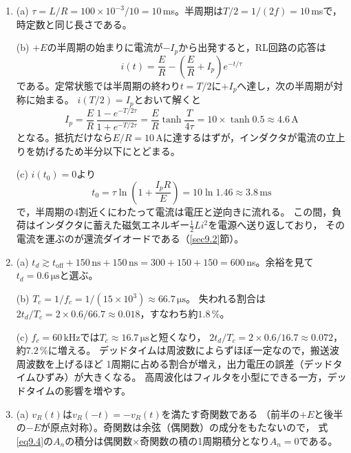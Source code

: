 \answer
\begin{enumerate}

\item[\ref{ex9.1}]
(a) $\tau = L/R = 100\times10^{-3}/10 = 10$\,ms。半周期は$T/2 = 1/(2f) = 10$\,msで，時定数と同じ長さである。

(b) $+E$の半周期の始まりに電流が$-I_p$から出発すると，RL回路の応答は
\begin{equation*}
i(t) = \frac{E}{R} - \left(\frac{E}{R} + I_p\right)e^{-t/\tau}
\end{equation*}
である。定常状態では半周期の終わり$t = T/2$に$+I_p$へ達し，次の半周期が対称に始まる。
$i(T/2) = I_p$とおいて解くと
\begin{equation*}
I_p = \frac{E}{R}\,\frac{1 - e^{-T/2\tau}}{1 + e^{-T/2\tau}} = \frac{E}{R}\tanh\frac{T}{4\tau}
= 10\times\tanh 0.5 \approx 4.6\,\mathrm{A}
\end{equation*}
となる。抵抗だけなら$E/R = 10$\,Aに達するはずが，インダクタが電流の立上りを妨げるため半分以下にとどまる。

(c) $i(t_0) = 0$より
\begin{equation*}
t_0 = \tau\ln\left(1 + \frac{I_pR}{E}\right) = 10\ln 1.46 \approx 3.8\,\mathrm{ms}
\end{equation*}
で，半周期の4割近くにわたって電流は電圧と逆向きに流れる。
この間，負荷はインダクタに蓄えた磁気エネルギー$\frac{1}{2}Li^2$を電源へ送り返しており，
その電流を運ぶのが還流ダイオードである（\ref{sec9.2}節）。

\item[\ref{ex9.2}]
(a) $t_d \gtrsim t_{\mathrm{off}} + 150\,\mathrm{ns} + 150\,\mathrm{ns}
= 300 + 150 + 150 = 600$\,ns。余裕を見て$t_d = 0.6\,\mathrm{\mu s}$と選ぶ。

(b) $T_c = 1/f_c = 1/(15\times10^3) \approx 66.7\,\mathrm{\mu s}$。
失われる割合は$2t_d/T_c = 2\times0.6/66.7 \approx 0.018$，すなわち約$1.8$\,\%。

(c) $f_c = 60$\,kHzでは$T_c \approx 16.7\,\mathrm{\mu s}$と短くなり，
$2t_d/T_c = 2\times0.6/16.7 \approx 0.072$，約$7.2$\,\%に増える。
デッドタイムは周波数によらずほぼ一定なので，搬送波周波数を上げるほど
1周期に占める割合が増え，出力電圧の誤差（デッドタイムひずみ）が大きくなる。
高周波化はフィルタを小型にできる一方，デッドタイムの影響を増やす。

\item[\ref{ex9.3}]
(a) $v_R(t)$は$v_R(-t) = -v_R(t)$を満たす奇関数である
（前半の$+E$と後半の$-E$が原点対称）。奇関数は余弦（偶関数）の成分をもたないので，
式\ref{eq9.4}の$A_n$の積分は偶関数$\times$奇関数の積の1周期積分となり$A_n = 0$である。


\end{enumerate}
